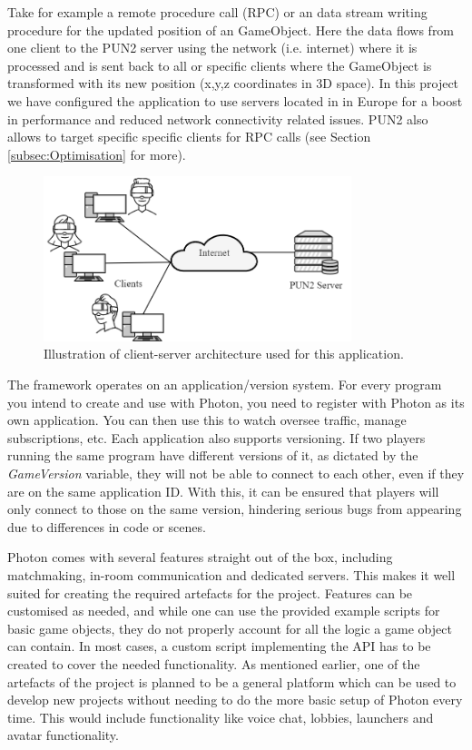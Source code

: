 Take for example a remote procedure call (RPC) or an data stream writing procedure for the updated position of an GameObject. Here the data flows from one client to the PUN2 server using the network (i.e. internet) where it is processed and is sent back to all or specific clients where the GameObject is transformed with its new position (x,y,z coordinates in 3D space). In this project we have configured the application to use servers located in in Europe for a boost in performance and reduced network connectivity related issues. PUN2 also allows to target specific specific clients for RPC calls (see Section \ref{subsec:Optimisation} for more). 

\begin{figure}[!ht]
    \centering
    \includegraphics[width=0.8\textwidth]{./fig/background/ClientServer.png}
    \caption{Illustration of client-server architecture used for this application. }
    \label{fig:ClientServer}
\end{figure}

The framework operates on an application/version system. For every program you intend to create and use with Photon, you need to register with Photon as its own application. You can then use this to watch oversee traffic, manage subscriptions, etc. Each application also supports versioning. If two players running the same program have different versions of it, as dictated by the \textit{GameVersion} variable, they will not be able to connect to each other, even if they are on the same application ID. With this, it can be ensured that players will only connect to those on the same version, hindering serious bugs from appearing due to differences in code or scenes.

Photon comes with several features straight out of the box, including matchmaking, in-room communication and dedicated servers. This makes it well suited for creating the required artefacts for the project. Features can be customised as needed, and while one can use the provided example scripts for basic game objects, they do not properly account for all the logic a game object can contain. In most cases, a custom script implementing the API has to be created to cover the needed functionality. As mentioned earlier, one of the artefacts of the project is planned to be a general platform which can be used to develop new projects without needing to do the more basic setup of Photon every time. This would include functionality like voice chat, lobbies, launchers and avatar functionality.

